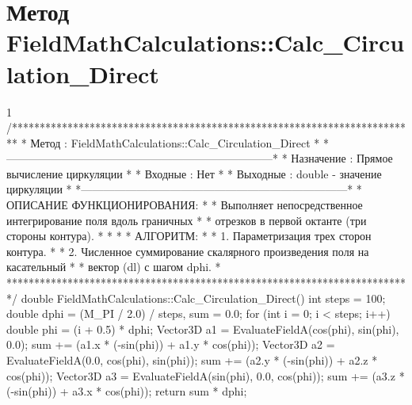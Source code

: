 \section{Метод FieldMathCalculations::Calc\_Circulation\_Direct}
\footnotesize
\begin{listing}{1}
/*************************************************************************
* Метод         : FieldMathCalculations::Calc_Circulation_Direct         *
*------------------------------------------------------------------------*
* Назначение    : Прямое вычисление циркуляции                          *
* Входные       : Нет                                                    *
* Выходные      : double - значение циркуляции                           *
*------------------------------------------------------------------------*
* ОПИСАНИЕ ФУНКЦИОНИРОВАНИЯ:                                             *
* Выполняет непосредственное интегрирование поля вдоль граничных         *
* отрезков в первой октанте (три стороны контура).                       *
* *
* АЛГОРИТМ:                                                              *
* 1. Параметризация трех сторон контура.                                 *
* 2. Численное суммирование скалярного произведения поля на касательный  *
* вектор (dl) с шагом dphi.                                              *
*************************************************************************/
double FieldMathCalculations::Calc_Circulation_Direct() {
    int steps = 100; 
    double dphi = (M_PI / 2.0) / steps, sum = 0.0;
    for (int i = 0; i < steps; i++) {
        double phi = (i + 0.5) * dphi;
        Vector3D a1 = EvaluateFieldA(cos(phi), sin(phi), 0.0);
        sum += (a1.x * (-sin(phi)) + a1.y * cos(phi));
        Vector3D a2 = EvaluateFieldA(0.0, cos(phi), sin(phi));
        sum += (a2.y * (-sin(phi)) + a2.z * cos(phi));
        Vector3D a3 = EvaluateFieldA(sin(phi), 0.0, cos(phi));
        sum += (a3.z * (-sin(phi)) + a3.x * cos(phi));
    }
    return sum * dphi;
}
\end{listing}
\normalsize

\pagebreak


